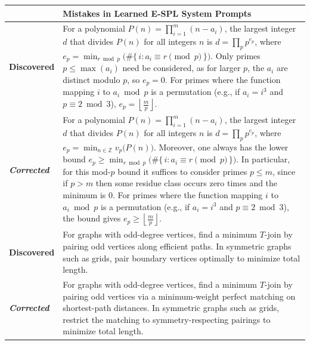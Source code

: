 \documentclass{article}
\theoremstyle{plain}
\theoremstyle{definition}
\theoremstyle{remark}
\begin{document}
\begin{table}[t]
\centering
\small
\vspace{-4pt}
\setlength{\tabcolsep}{3.5pt}
\renewcommand{\arraystretch}{1.0}
\begin{tabular}{%
  p{}|
  >{\raggedright\arraybackslash\renewcommand{\baselinestretch}{1.15}\selectfont}p{}
}

\toprule
\textbf{} & \textbf{Mistakes in Learned E-SPL System Prompts} \\
\midrule
\textbf{Discovered}
&
For a polynomial $P(n) = {\textstyle\prod}_{i=1}^m (n - a_i)$, the largest integer $d$ that divides $P(n)$ for all integers $n$ is $d = {\textstyle\prod}_{p} p^{e_p}$, {\color{Brown} where
$e_p = \min_{r \bmod p} \bigl(\#\{\, i : a_i \equiv r \!\!\pmod p \,\}\bigr).$
Only primes $p \le \max(a_i)$ need be considered, as for larger $p$, the $a_i$ are distinct modulo $p$, so $e_p = 0$.}
For primes where the function mapping $i$ to $a_i \bmod p$ is a permutation (e.g., if $a_i = i^3$ and $p \equiv 2 \bmod 3$), {\color{Brown}$e_p = {{\left\lfloor \frac{m}{p} \right\rfloor}}$.
} \\
\midrule
\textit{\textbf{Corrected}} 
&
For a polynomial $P(n) = \prod_{i=1}^m (n - a_i)$, the largest integer $d$ that divides $P(n)$ for all integers $n$ is $d = \prod_{p} p^{e_p}$, {\color{MidnightBlue} where $e_p = \min_{n \in \mathbb{Z}} v_p\!\bigl(P(n)\bigr).$ Moreover, one always has the lower bound $e_p \ge \min_{r \bmod p} \bigl(\#\{\, i : a_i \equiv r \!\!\pmod p \,\}\bigr).$ In particular, for this mod-$p$ bound it suffices to consider primes $p \le m$, since if $p>m$ then some residue class occurs zero times and the minimum is $0$.} 
For primes where the function mapping $i$ to $a_i \bmod p$ is a permutation (e.g., if $a_i = i^3$ and $p \equiv 2 \bmod 3$), the bound gives {\color{MidnightBlue}$e_p \boldsymbol{\ge} \left\lfloor \frac{m}{p} \right\rfloor.$
} \\
\midrule
\textbf{Discovered}
&
For graphs with odd-degree vertices, find a minimum \(T\)-join by {\color{Brown}pairing odd vertices along efficient paths}. In symmetric graphs such as grids, {\color{Brown}pair boundary vertices} optimally to minimize total length.
\\
\midrule
\textit{\textbf{Corrected}} 
&
For graphs with odd-degree vertices, find a minimum $T$-join by {\color{MidnightBlue}pairing odd vertices via a minimum-weight perfect matching on shortest-path distances}. In symmetric graphs such as grids, {\color{MidnightBlue}restrict the matching to symmetry-respecting pairings} to minimize total length.

\end{tabular}
\end{table}
\end{document}
